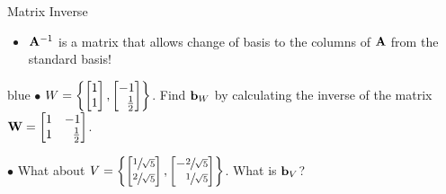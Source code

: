 \documentclass[aspectratio=169]{beamer}
\let\olditem\item
\renewcommand{\item}{\setlength{\itemsep}{\fill}\olditem}
\def\mf{\ensuremath\mathbf}
\def\lc{\ensuremath\left\{}
\def\rc{\ensuremath\right\}}
\begin{document}
\begin{frame}[t]{Matrix Inverse}
\begin{itemize}
    \item $\mf{A}^{-1}$ is a matrix that allows change of basis to the columns of $\mf{A}$ from the standard basis!
\end{itemize}
\vspace{1cm}

\begin{color}{blue}
    $\bullet$ $W = \lc \begin{bmatrix*}[r]1\\1\end{bmatrix*}, \begin{bmatrix*}[r]-1\\\frac{1}{2}\end{bmatrix*} \rc$. Find $\mf{b}_W$ by calculating the inverse of the matrix $\mf{W} = \begin{bmatrix*}[r]1 & -1\\1 & \frac{1}{2}\end{bmatrix*}$.\\ \vspace{0.2cm}

    $\bullet$ What about $V = \lc \begin{bmatrix*}[r]\sfrac{1}{\sqrt{5}}\\\sfrac{2}{\sqrt{5}}\end{bmatrix*}, \begin{bmatrix*}[r]-\sfrac{2}{\sqrt{5}}\\\sfrac{1}{\sqrt{5}}\end{bmatrix*} \rc$. What is $\mf{b}_V$?
\end{color}
\end{frame}
\end{document}
